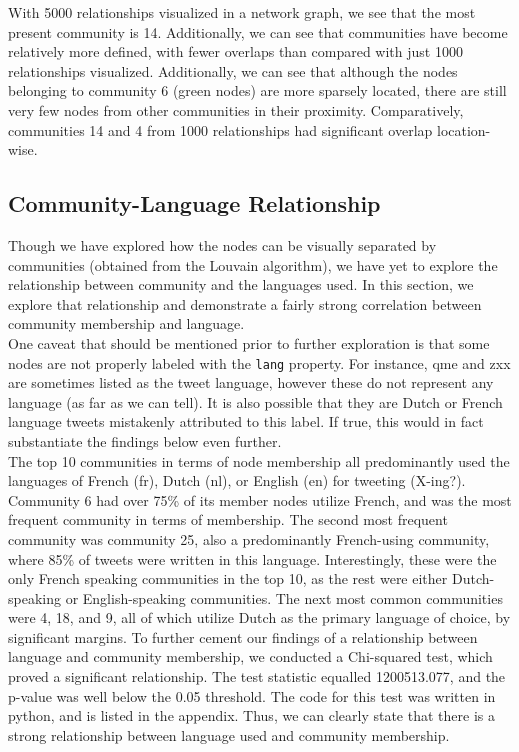 \documentclass{article}
\begin{document}
With 5000 relationships visualized in a network graph, we see that the most present community is 14. Additionally, we can see that communities have become relatively more defined, with fewer overlaps than compared with just 1000 relationships visualized. Additionally, we can see that although the nodes belonging to community 6 (green nodes) are more sparsely located, there are still very few nodes from other communities in their proximity. Comparatively, communities 14 and 4 from 1000 relationships had significant overlap location-wise. \\

\subsection{Community-Language Relationship}
Though we have explored how the nodes can be visually separated by communities (obtained from the Louvain algorithm), we have yet to explore the relationship between community and the languages used. In this section, we explore that relationship and demonstrate a fairly strong correlation between community membership and language.\\

One caveat that should be mentioned prior to further exploration is that some nodes are not properly labeled with the \verb|lang| property. For instance, qme and zxx are sometimes listed as the tweet language, however these do not represent any language (as far as we can tell). It is also possible that they are Dutch or French language tweets mistakenly attributed to this label. If true, this would in fact substantiate the findings below even further. \\

The top 10 communities in terms of node membership all predominantly used the languages of French (fr), Dutch (nl), or English (en) for tweeting (X-ing?). Community 6 had over 75\% of its member nodes utilize French, and was the most frequent community in terms of membership. The second most frequent community was community 25, also a predominantly French-using community, where 85\% of tweets were written in this language. Interestingly, these were the only French speaking communities in the top 10, as the rest were either Dutch-speaking or English-speaking communities. The next most common communities were 4, 18, and 9, all of which utilize Dutch as the primary language of choice, by significant margins. To further cement our findings of a relationship between language and community membership, we conducted a Chi-squared test, which proved a significant relationship. The test statistic equalled 1200513.077, and the p-value was well below the 0.05 threshold. The code for this test was written in python, and is listed in the appendix. Thus, we can clearly state that there is a strong relationship between language used and community membership.\\
\end{document}
